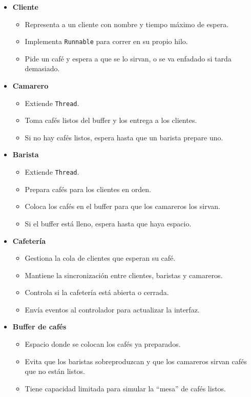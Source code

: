 \documentclass[12pt,a4paper]{article}
\begin{document}
\begin{itemize}
    \item \textbf{Cliente}
    \begin{itemize}
        \item Representa a un cliente con nombre y tiempo máximo de espera.
        \item Implementa \texttt{Runnable} para correr en su propio hilo.
        \item Pide un café y espera a que se lo sirvan, o se va enfadado si tarda demasiado.
    \end{itemize}

    \item \textbf{Camarero}
    \begin{itemize}
        \item Extiende \texttt{Thread}.
        \item Toma cafés listos del buffer y los entrega a los clientes.
        \item Si no hay cafés listos, espera hasta que un barista prepare uno.
    \end{itemize}

    \item \textbf{Barista}
    \begin{itemize}
        \item Extiende \texttt{Thread}.
        \item Prepara cafés para los clientes en orden.
        \item Coloca los cafés en el buffer para que los camareros los sirvan.
        \item Si el buffer está lleno, espera hasta que haya espacio.
    \end{itemize}

    \item \textbf{Cafetería}
    \begin{itemize}
        \item Gestiona la cola de clientes que esperan su café.
        \item Mantiene la sincronización entre clientes, baristas y camareros.
        \item Controla si la cafetería está abierta o cerrada.
        \item Envía eventos al controlador para actualizar la interfaz.
    \end{itemize}

    \item \textbf{Buffer de cafés}
    \begin{itemize}
        \item Espacio donde se colocan los cafés ya preparados.
        \item Evita que los baristas sobreproduzcan y que los camareros sirvan cafés que no están listos.
        \item Tiene capacidad limitada para simular la “mesa” de cafés listos.
    \end{itemize}
\end{itemize}
\end{document}
